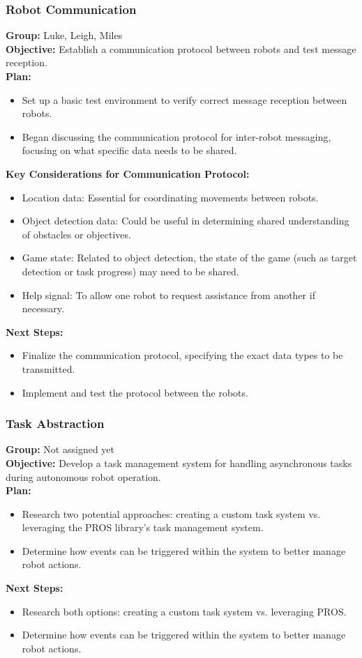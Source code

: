 \subsubsection{Robot Communication}
\noindent
\textbf{Group:} Luke, Leigh, Miles\\
\textbf{Objective:} Establish a communication protocol between robots and test message reception.\\
\textbf{Plan:}
\begin{itemize}
  \item Set up a basic test environment to verify correct message reception between robots.
  \item Began discussing the communication protocol for inter-robot messaging, focusing on what specific data needs to be shared.
\end{itemize}
\textbf{Key Considerations for Communication Protocol:}
\begin{itemize}
  \item Location data: Essential for coordinating movements between robots.
  \item Object detection data: Could be useful in determining shared understanding of obstacles or objectives.
  \item Game state: Related to object detection, the state of the game (such as target detection or task progress) may need to be shared.
  \item Help signal: To allow one robot to request assistance from another if necessary.
\end{itemize}
\textbf{Next Steps:}
\begin{itemize}
  \item Finalize the communication protocol, specifying the exact data types to be transmitted.
  \item Implement and test the protocol between the robots.
\end{itemize}

\subsubsection{Task Abstraction}
\noindent
\textbf{Group:} Not assigned yet\\
\textbf{Objective:} Develop a task management system for handling asynchronous tasks during autonomous robot operation.\\
\textbf{Plan:}
\begin{itemize}
  \item Research two potential approaches: creating a custom task system vs. leveraging the PROS library's task management system.
  \item Determine how events can be triggered within the system to better manage robot actions.
\end{itemize}
\textbf{Next Steps:}
\begin{itemize}
  \item Research both options: creating a custom task system vs. leveraging PROS.
  \item Determine how events can be triggered within the system to better manage robot actions.
\end{itemize}

